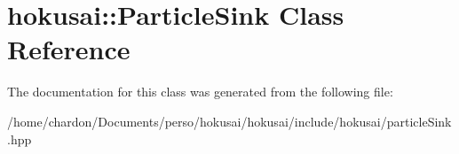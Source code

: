\hypertarget{classhokusai_1_1ParticleSink}{\section{hokusai\+:\+:Particle\+Sink Class Reference}
\label{classhokusai_1_1ParticleSink}
}


The documentation for this class was generated from the following file\+:\begin{DoxyCompactItemize}
\item 
/home/chardon/\+Documents/perso/hokusai/hokusai/include/hokusai/particle\+Sink.\+hpp\end{DoxyCompactItemize}

